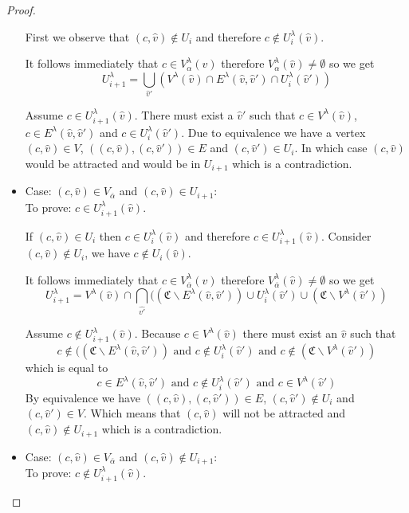 \begin{lemma}
\begin{proof}
\begin{itemize}
			
			First we observe that $(c,\hat{v}) \notin U_i$ and therefore $c \notin U^\lambda_i(\hat{v})$.
			
			It follows immediately that $c \in V^\lambda_{\alpha}(\hat{v})$ therefore $V^\lambda_{\alpha}(\hat{v}) \neq \emptyset$ so we get
			\[ U^\lambda_{i+1} =\bigcup_{\hat{v}'} (V^\lambda(\hat{v}) \cap E^\lambda(\hat{v},\hat{v}') \cap U^\lambda_i(\hat{v}')) \]
			
			Assume $c \in U^\lambda_{i+1}(\hat{v})$. There must exist a $\hat{v}'$ such that $c \in V^\lambda(\hat{v})$, $c \in E^\lambda(\hat{v},\hat{v}')$ and $c \in U^\lambda_i(\hat{v}')$. Due to equivalence we have a vertex $(c,\hat{v}) \in V$, $((c,\hat{v}),(c,\hat{v}')) \in E$ and $(c,\hat{v}') \in U_i$. In which case $(c,\hat{v})$ would be attracted and would be in $U_{i+1}$ which is a contradiction.
			\item Case: $(c, \hat{v}) \in V_{\overline{\alpha}}$ and $(c,\hat{v}) \in U_{i+1}$:\\
			To prove: $c \in U^\lambda_{i+1}(\hat{v})$.
			
			If $(c,\hat{v}) \in U_i$ then $c \in U^\lambda_i(\hat{v})$ and therefore $c \in U^\lambda_{i+1}(\hat{v})$. Consider $(c,\hat{v}) \notin U_i$, we have $c \notin U_i(\hat{v})$.
			
			It follows immediately that $c \in V^\lambda_{\overline{\alpha}}(\hat{v})$ therefore $V^\lambda_{\overline{\alpha}}(\hat{v}) \neq \emptyset$ so we get
			\[ U^\lambda_{i+1} =V^\lambda(\hat{v}) \cap \bigcap_{\hat{v'}}((\mathfrak{C} \backslash E^\lambda(\hat{v},\hat{v}')) \cup U^\lambda_i(\hat{v}') \cup (\mathfrak{C}\backslash V^\lambda(\hat{v}')) \]
			
			Assume $c \notin U^\lambda_{i+1}(\hat{v})$. Because $c \in V^\lambda(\hat{v})$ there must exist an $\hat{v}$ such that
			\[ c \notin ((\mathfrak{C} \backslash E^\lambda(\hat{v},\hat{v}')) \text{ and } c \notin U^\lambda_i(\hat{v}') \text{ and } c \notin (\mathfrak{C}\backslash V^\lambda(\hat{v}')) \]
			which is equal to
			\[ c \in E^\lambda(\hat{v},\hat{v}') \text{ and } c \notin U^\lambda_i(\hat{v}') \text{ and } c \in V^\lambda(\hat{v}') \]
			By equivalence we have $((c,\hat{v}),(c,\hat{v}')) \in E$, $(c,\hat{v}') \notin U_i$ and $(c,\hat{v}') \in V$. Which means that $(c,\hat{v})$ will not be attracted and $(c,\hat{v}) \notin U_{i+1}$ which is a contradiction.
			\item Case: $(c, \hat{v}) \in V_{\overline{\alpha}}$ and $(c,\hat{v}) \notin U_{i+1}$:\\
			To prove: $c \notin U^\lambda_{i+1}(\hat{v})$.
			

\end{itemize}
\end{proof}
\end{lemma}
